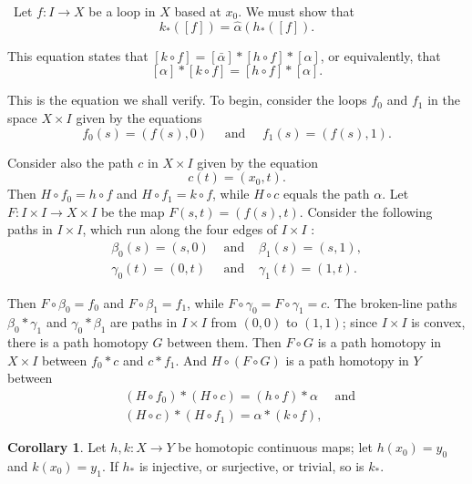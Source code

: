 \documentclass[12pt,a4paper]{book}
\newenvironment{prooff}{{\noindent\it\textcolor{cyan!40!black}{Proof}:}\,}{\par}
\theoremstyle{definition}
\newtheorem{coro}[defn]{Corollary}
\begin{document}
\begin{prooff}
    Let $f: I \rightarrow X$ be a loop in $X$ based at $x_0$. We must show that
    $$
        k_*([f])=\hat{\alpha}\left(h_*([f]) .\right.
    $$

    This equation states that $[k \circ f]=[\bar{\alpha}] *[h \circ f] *[\alpha]$, or equivalently, that
    $$
        [\alpha] *[k \circ f]=[h \circ f] *[\alpha] .
    $$

    This is the equation we shall verify.
    To begin, consider the loops $f_0$ and $f_1$ in the space $X \times I$ given by the equations
    $$
        f_0(s)=(f(s), 0) \quad \text { and } \quad f_1(s)=(f(s), 1) .
    $$

    Consider also the path $c$ in $X \times I$ given by the equation
    $$
        c(t)=\left(x_0, t\right) .
    $$
    Then $H \circ f_0=h \circ f$ and $H \circ f_1=k \circ f$, while $H \circ c$ equals the path $\alpha$.
    Let $F: I \times I \rightarrow X \times I$ be the map $F(s, t)=(f(s), t)$. Consider the following paths in $I \times I$, which run along the four edges of $I \times I$ :
    $$
        \begin{array}{lll}
            \beta_0(s)=(s, 0)  & \text { and } & \beta_1(s)=(s, 1),   \\
            \gamma_0(t)=(0, t) & \text { and } & \gamma_1(t)=(1, t) .
        \end{array}
    $$

    Then $F \circ \beta_0=f_0$ and $F \circ \beta_1=f_1$, while $F \circ \gamma_0=F \circ \gamma_1=c$.
    The broken-line paths $\beta_0 * \gamma_1$ and $\gamma_0 * \beta_1$ are paths in $I \times I$ from $(0,0)$ to $(1,1)$; since $I \times I$ is convex, there is a path homotopy $G$ between them. Then $F \circ G$ is a path homotopy in $X \times I$ between $f_0 * c$ and $c * f_1$. And $H \circ(F \circ G)$ is a path homotopy in $Y$ between
    $$
        \begin{aligned}
             & \left(H \circ f_0\right) *(H \circ c)=(h \circ f) * \alpha \quad \text { and } \\
             & (H \circ c) *\left(H \circ f_1\right)=\alpha *(k \circ f),
        \end{aligned}
    $$
\end{prooff}
\begin{coro}
    Let $h, k: X \rightarrow Y$ be homotopic continuous maps; let $h\left(x_0\right)=y_0$ and $k\left(x_0\right)=y_1$. If $h_*$ is injective, or surjective, or trivial, so is $k_*$.
\end{coro}
\end{document}
